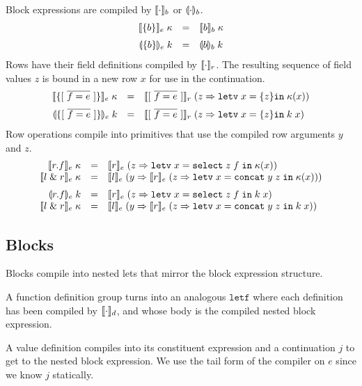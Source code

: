 \documentclass[11pt]{article}
\newcommand{\kw}[1]{\mathtt{#1}}
\begin{document}
Block expressions are compiled by $\llbracket \cdot \rrbracket_b$ or $\llparenthesis \cdot \rrparenthesis_b$.
\[
\begin{array}{rcll}
\cmpk{e}{\blke{b}} & = &
  \cmpin{b}{b}{\kappa} \medskip \\

\tcmpk{e}{\blke{b}} & = &
  \tcmpin{b}{b}{k} \\
\end{array}
\]
Rows have their field definitions compiled by $\llbracket \cdot \rrbracket_r$.
The resulting sequence of field values $z$ is bound in a new row $x$ for use in the continuation.
\[
\begin{array}{rcll}
\cmpk{e}{\rowe{f}{e}} & = &
  \cmpin{r}{\flds{f}{e}}{(z => \letv{x}{\rowvs{z}}{\kappa(x)})} \medskip \\

\tcmpk{e}{\rowe{f}{e}} & = &
  \cmpin{r}{\flds{f}{e}}{(z => \letv{x}{\rowvs{z}}{\appc{k}{x}})} \\
\end{array}
\]
Row operations compile into primitives that use the compiled row arguments $y$ and $z$.
\[
\begin{array}{rcll}
\cmpk{e}{\sele{r}{f}} & = &
  \cmpin{e}{r}{(z => \letv{x}{\selv{z}{f}}{\kappa(x)})} \\
\cmpk{e}{\ande{l}{r}} & = &
  \cmpin{e}{l}{(y => \cmpin{e}{r}{(z => \letv{x}{\andv{y}{z}}{\kappa(x)})})} \medskip \\

\tcmpk{e}{\sele{r}{f}} & = &
  \cmpin{e}{r}{(z => \letv{x}{\selv{z}{f}}{\appc{k}{x}})} \\
\cmpk{e}{\ande{l}{r}} & = &
  \cmpin{e}{l}{(y => \cmpin{e}{r}{(z => \letv{x}{\andv{y}{z}}{\appc{k}{x}})})} \\
\end{array}
\]

\subsection*{Blocks}

Blocks compile into nested lets that mirror the block expression structure.

A function definition group turns into an analogous $\kw{letf}$ where each definition has been compiled by $\llbracket \cdot \rrbracket_d$, and whose body is the compiled nested block expression.

A value definition compiles into its constituent expression and a continuation $j$ to get to the nested block expression.
We use the tail form of the compiler on $e$ since we know $j$ statically.
\end{document}
